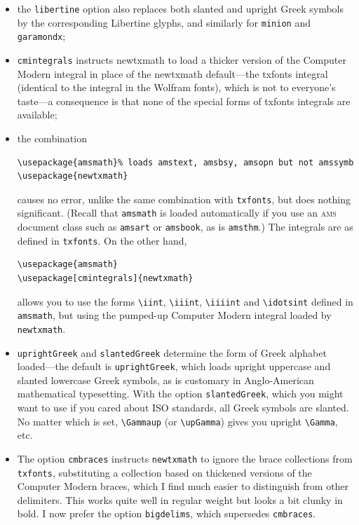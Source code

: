 \documentclass[11pt]{article}
\begin{document}
\begin{itemize}
\begin{verbatim}
\usepackage[osf,scaled=.92]{heuristica} %extension of Utopia
\usepackage[varqu,varl]{inconsolata} % sans typewriter
\usepackage[scaled=.95]{cabin} % sans serif
\usepackage[utopia,bigdelims,vvarbb]{newtxmath}
\end{verbatim}
\item the {\tt libertine} option also replaces both slanted and upright Greek  symbols by the corresponding Libertine glyphs, and similarly for {\tt minion} and {\tt garamondx};
\item
{\tt cmintegrals} instructs \textsf{newtxmath} to load a thicker version of the Computer Modern integral in place of the \textsf{newtxmath} default---the txfonts integral (identical to the integral in the Wolfram fonts), which is not to everyone's taste---a consequence is that none of the special forms of \textsf{txfonts} integrals are available;
\item the combination
\begin{verbatim}
\usepackage{amsmath}% loads amstext, amsbsy, amsopn but not amssymb
\usepackage{newtxmath}
\end{verbatim}
causes no error, unlike the same combination with {\tt txfonts}, but does nothing significant. (Recall that {\tt amsmath} is loaded automatically if you use an \textsc{ams} document class such as {\tt amsart} or {\tt amsbook}, as is {\tt amsthm}.) The integrals are as defined in {\tt txfonts}. On the other hand,
\begin{verbatim}
\usepackage{amsmath}
\usepackage[cmintegrals]{newtxmath}
\end{verbatim}
allows you to use the forms \verb|\iint|, \verb|\iiint|, \verb|\iiiint| and \verb|\idotsint| defined in {\tt amsmath}, but using the pumped-up Computer Modern integral loaded by {\tt newtxmath}. 
\item {\tt uprightGreek} and {\tt slantedGreek} determine the form of Greek alphabet loaded---the default is {\tt uprightGreek}, which loads upright uppercase and slanted lowercase Greek symbols, as is customary in Anglo-American mathematical typesetting. With the option {\tt slantedGreek}, which you might want to use if you cared about ISO standards, all Greek symbols are slanted. No matter which is set, \verb|\Gammaup| (or \verb|\upGamma|) gives you upright \verb|\Gamma|, etc.
\item The option {\tt cmbraces} instructs {\tt newtxmath} to ignore the brace collections from {\tt txfonts}, substituting a collection based on thickened versions of the Computer Modern braces, which I find much easier to distinguish from other delimiters. This works quite well in regular weight but looks a bit clunky in bold. I now prefer the option {\tt bigdelims}, which supersedes {\tt cmbraces}.

\end{itemize}
\end{document}
